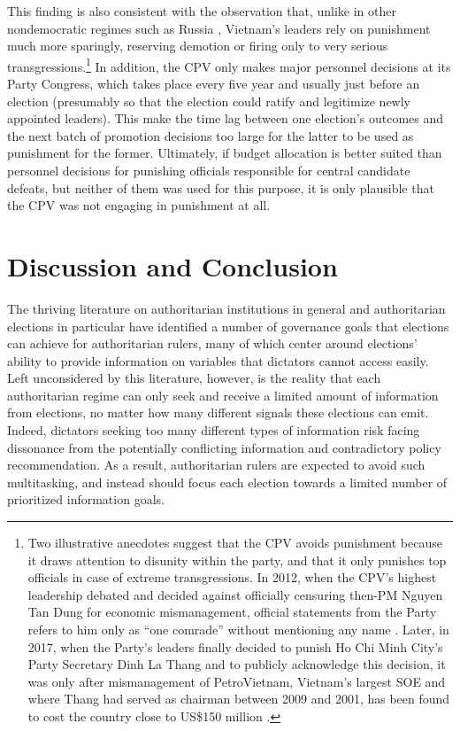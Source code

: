 \documentclass[12pt]{article}
\newcommand{\1}{\mathbbm{1}}
\begin{document}
This finding is also consistent with the observation that, unlike in other nondemocratic regimes such as Russia \citep{Myagkov2009}, Vietnam's leaders rely on punishment much more sparingly, reserving demotion or firing only to very serious transgressions.\footnote{Two illustrative anecdotes suggest that the CPV avoids punishment because it draws attention to disunity within the party, and that it only punishes top officials in case of extreme transgressions. In 2012, when the CPV's highest leadership debated and decided against officially censuring then-PM Nguyen Tan Dung for economic mismanagement, official statements from the Party refers to him only as ``one comrade'' without mentioning any name \citep{voa2012}. Later, in 2017, when the Party's leaders finally decided to punish Ho Chi Minh City's Party Secretary Dinh La Thang and to publicly acknowledge this decision, it was only after mismanagement of PetroVietnam, Vietnam's largest SOE and where Thang had served as chairman between 2009 and 2001, has been found to cost the country close to US\$150 million \citep{BBC2017}.} In addition, the CPV only makes major personnel decisions at its Party Congress, which takes place every five year and usually just before an election (presumably so that the election could ratify and legitimize newly appointed leaders). This make the time lag between one election's outcomes and the next batch of promotion decisions too large for the latter to be used as punishment for the former. Ultimately, if budget allocation is better suited than personnel decisions for punishing officials responsible for central candidate defeats, but neither of them was used for this purpose, it is only plausible that the CPV was not engaging in punishment at all.

\section{Discussion and Conclusion}

The thriving literature on authoritarian institutions in general and authoritarian elections in particular have identified a number of governance goals that elections can achieve for authoritarian rulers, many of which center around elections' ability to provide information on variables that dictators cannot access easily. Left unconsidered by this literature, however, is the reality that each authoritarian regime can only seek and receive a limited amount of information from elections, no matter how many different signals these elections can emit. Indeed, dictators seeking too many different types of information risk facing dissonance from the potentially conflicting information and contradictory policy recommendation. As a result, authoritarian rulers are expected to avoid such multitasking, and instead should focus each election towards a limited number of prioritized information goals.
\end{document}
